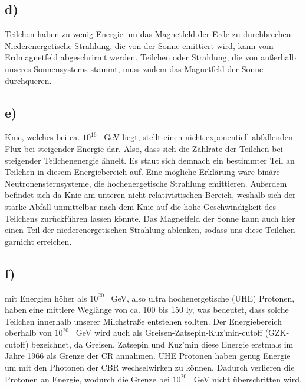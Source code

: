 \subsection{d)}

    \justifying Teilchen haben zu wenig Energie um das Magnetfeld der Erde zu durchbrechen. Niederenergetische Strahlung, die von der Sonne emittiert 
    wird, kann vom Erdmagnetfeld abgeschrirmt werden. Teilchen oder Strahlung, die von außerhalb unseres Sonnensystems stammt, muss zudem das Magnetfeld der Sonne durchqueren. 

\subsection{e)}

    \justifying Knie, welches bei ca. $10^{16}$ \SI{}{\giga\electronvolt} liegt, stellt einen nicht-exponentiell abfallenden Flux bei steigender Energie dar. Also, dass 
    sich die Zählrate der Teilchen bei steigender Teilchenenergie ähnelt. Es staut sich demnach ein bestimmter Teil an Teilchen in diesem Energiebereich auf. Eine mögliche Erklärung
    wäre binäre Neutronensternsysteme, die hochenergetische Strahlung emittieren. Außerdem befindet sich da Knie am unteren nicht-relativistischen Bereich, weshalb sich der starke
    Abfall unmittelbar nach dem Knie auf die hohe Geschwindigkeit des Teilchens zurückführen lassen könnte. Das Magnetfeld der Sonne kann auch hier einen Teil der niederenergetischen
    Strahlung ablenken, sodass uns diese Teilchen garnicht erreichen. 

\subsection{f)}

    \justifying mit Energien höher als $10^{20}$ \SI{}{\giga\electronvolt}, also ultra hochenergetische (UHE) Protonen, haben eine mittlere Weglänge von ca. 100 bis
    150 ly, was bedeutet, dass solche Teilchen innerhalb unserer Milchstraße entstehen sollten. Der Energiebereich oberhalb von $10^{20}$ \SI{}{\giga\electronvolt} wird auch als 
    Greisen-Zatsepin-Kuz'min-cutoff (GZK-cutoff) bezeichnet, da Greisen, Zatsepin und Kuz'min diese Energie erstmals im Jahre 1966 als Grenze der CR annahmen. UHE Protonen haben 
    genug Energie um mit den Photonen der CBR wechselwirken zu können. Dadurch verlieren die Protonen an Energie, wodurch die Grenze bei $10^{20}$ \SI{}{\giga\electronvolt} nicht
    überschritten wird. 


